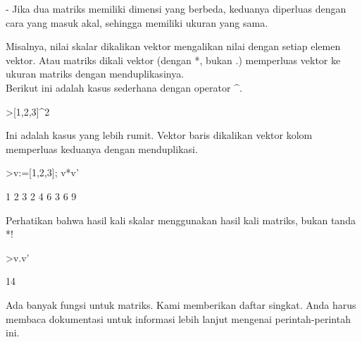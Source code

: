 \documentclass{article}
\begin{document}
\begin{eulernotebook}
\begin{eulercomment}
- Jika dua matriks memiliki dimensi yang berbeda, keduanya diperluas
dengan cara yang masuk akal, sehingga memiliki ukuran yang sama.

Misalnya, nilai skalar dikalikan vektor mengalikan nilai dengan setiap
elemen vektor. Atau matriks dikali vektor (dengan *, bukan .)
memperluas vektor ke ukuran matriks dengan menduplikasinya.\\
Berikut ini adalah kasus sederhana dengan operator \textasciicircum{}.
\end{eulercomment}
\begin{eulerprompt}
>[1,2,3]^2
\end{eulerprompt}
\begin{euleroutput}
  [1,  4,  9]
\end{euleroutput}
\begin{eulercomment}
Ini adalah kasus yang lebih rumit. Vektor baris dikalikan vektor kolom
memperluas keduanya dengan menduplikasi.
\end{eulercomment}
\begin{eulerprompt}
>v:=[1,2,3]; v*v'
\end{eulerprompt}
\begin{euleroutput}
              1             2             3 
              2             4             6 
              3             6             9 
\end{euleroutput}
\begin{eulercomment}
Perhatikan bahwa hasil kali skalar menggunakan hasil kali matriks,
bukan tanda *!
\end{eulercomment}
\begin{eulerprompt}
>v.v'
\end{eulerprompt}
\begin{euleroutput}
  14
\end{euleroutput}
\begin{eulercomment}
Ada banyak fungsi untuk matriks. Kami memberikan daftar singkat. Anda
harus membaca dokumentasi untuk informasi lebih lanjut mengenai
perintah-perintah ini.


\end{eulercomment}
\end{eulernotebook}
\end{document}
